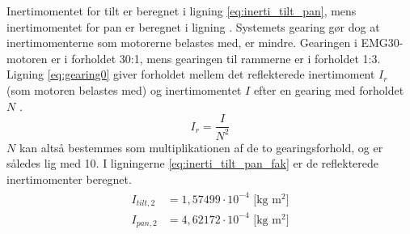 Inertimomentet for tilt er beregnet i ligning \ref{eq:inerti_tilt_pan}, mens inertimomentet for pan er beregnet i ligning \label{eq:pan_inerti}.
Systemets gearing gør dog at inertimomenterne som motorerne belastes med, er mindre.
Gearingen i EMG30-motoren er i forholdet 30:1, mens gearingen til rammerne er i forholdet 1:3.
Ligning \ref{eq:gearing0} giver forholdet mellem det reflekterede inertimoment \(I_r\) (som motoren belastes med)
og inertimomentet \(I\) efter en gearing med forholdet \(N\) \citep{gear_inerti}.
\begin{equation}
I_r=\frac{I}{N^2}
\label{eq:gearing0}
\end{equation}
\(N\) kan altså bestemmes som multiplikationen af de to gearingsforhold, og er således lig med 10.
I ligningerne \ref{eq:inerti_tilt_pan_fak} er de reflekterede inertimomenter beregnet.
\begin{align}
\label{eq:inerti_tilt_pan_fak}
\begin{split}
{I_{tilt,2}}&=1,57499\cdot{10}^{-4} \text{ [kg m$^2$]}
\\
{I_{pan,2}}&=4,62172\cdot{10}^{-4} \text{ [kg m$^2$]}
\end{split}
\end{align}
